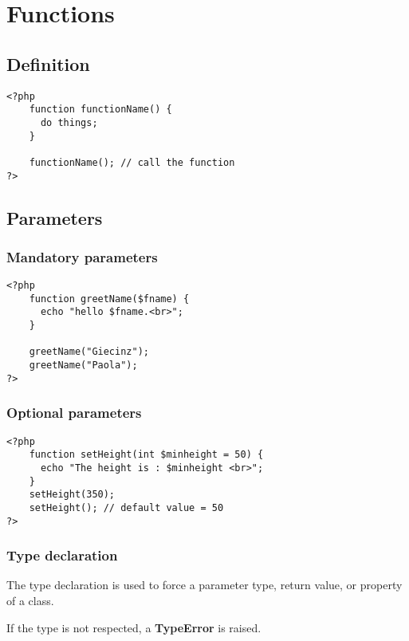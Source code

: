 \documentclass[a4paper]{article}
\begin{document}
\pagebreak

\section{Functions}

\subsection{Definition}

\begin{lstlisting}
<?php
    function functionName() {
      do things;
    }
    
    functionName(); // call the function
?>
\end{lstlisting}

\subsection{Parameters}

\subsubsection{Mandatory parameters}

\begin{lstlisting}
<?php
    function greetName($fname) {
      echo "hello $fname.<br>";
    }
    
    greetName("Giecinz");
    greetName("Paola");
?>
\end{lstlisting}

\subsubsection{Optional parameters}

\begin{lstlisting}
<?php
    function setHeight(int $minheight = 50) {
      echo "The height is : $minheight <br>";
    }
    setHeight(350);
    setHeight(); // default value = 50
?>
\end{lstlisting}

\subsubsection{Type declaration}

The type declaration is used to force a parameter type, return value,
or property of a class. 

If the type is not respected, a \textbf{TypeError} is raised.
\end{document}
